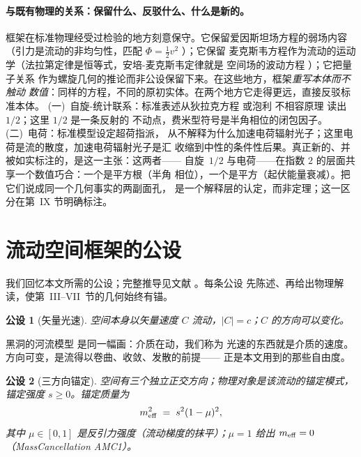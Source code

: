 \documentclass[aps,prd,preprint,superscriptaddress,amsmath,amssymb]{revtex4-2}
\newtheorem{postulate}{公设}[section]
\begin{document}
\paragraph{与既有物理的关系：保留什么、反驳什么、什么是新的。}
框架在标准物理经受过检验的地方刻意保守。它保留爱因斯坦场方程的弱场内容
（引力是流动的非均匀性，匹配 $\Phi=\tfrac12 v^2$
\cite{einstein1915feldgleichungen,gordon1923lichtfortpflanzung}）；它保留
麦克斯韦方程作为流动的运动学（法拉第定律是恒等式，安培-麦克斯韦定律就是
空间场的波动方程 \cite{maxwell1996dynamical}）；它把量子关系
\cite{planck1978gesetz,de1924recherches,heisenberg1927anschaulichen}
作为螺旋几何的推论而非公设保留下来。在这些地方，框架\emph{重写本体而不触动
数值}：同样的方程，不同的原初实体。在两个地方它走得更远，直接反驳标准本体。
(一)~自旋-统计联系：标准表述从狄拉克方程 \cite{dirac1928quantum} 或泡利
不相容原理 \cite{pauli1925zusammenhang} 读出 $1/2$；这里 $1/2$ 是一条反射的
不动点，费米型符号是半角相位的闭包因子。(二)~电荷：标准模型设定超荷指派，
从不解释为什么加速电荷辐射光子；这里电荷是流的散度，加速电荷辐射光子是汇
收缩到中性的条件性后果。真正新的、并被如实标注的，是这一主张：这两者——
自旋~$1/2$ 与电荷——在指数 $2$ 的层面共享一个数值巧合：一个是平方根（半角
相位），一个是平方（起伏能量衰减）。把它们说成同一个几何事实的两副面孔，
是一个解释层的认定，而非定理；这一区分在第~IX 节明确标注。

\section{流动空间框架的公设}
\label{sec:postulates}

我们回忆本文所需的公设；完整推导见文献 \cite{ProjectionPhysics}。每条公设
先陈述、再给出物理解读，使第~III--VII~节的几何始终有锚。

\begin{postulate}[矢量光速]
\label{post:sls}
空间本身以矢量速度 $C$ 流动，$|C|=c$；$C$ 的方向可以变化。
\end{postulate}

黑洞的河流模型 \cite{hamilton2008river} 是同一幅画：介质在动，我们称为
光速的东西就是介质的速度。方向可变，是流得以卷曲、收敛、发散的前提——
正是本文用到的那些自由度。

\begin{postulate}[三方向锚定]
\label{post:three}
空间有三个独立正交方向；物理对象是该流动的锚定模式，锚定强度
$s\ge 0$。锚定质量为
\begin{equation}
\label{eq:anchor}
m^2_{\rm eff}\;=\;s^2(1-\mu)^2 ,
\end{equation}
其中 $\mu\in[0,1]$ 是反引力强度（流动梯度的抹平）；$\mu=1$ 给出
$m_{\rm eff}=0$（MassCancellation AMC1）。
\end{postulate}
\end{document}
